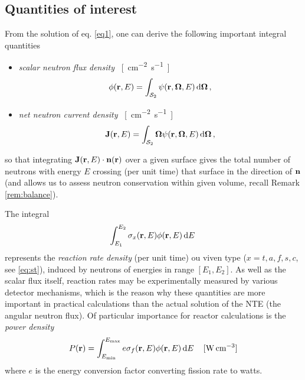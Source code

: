 \subsection{Quantities of interest}\label{sec:qoi}
From the solution of eq. \eqref{eq1}, one can derive the following important integral quantities
\begin{itemize}
  \item \textit{scalar neutron flux density} \SI{}{[cm^{-2}.s^{-1}]}
  \begin{equation}\label{eq:scalar_flux}
    \phi(\mathbf{r}, E) = \int_{\mathcal{S}_2}\psi(\mathbf{r},\mathbf{\Omega},E)\,\text{d}\mathbf{\Omega}\,,
  \end{equation}
  \item \textit{net neutron current density} \SI{}{[cm^{-2}.s^{-1}]}
	\begin{equation}\label{eq:bJ}
		\mathbf{J}(\mathbf{r}, E)	= \int_{\mathcal{S}_2}\mathbf{\Omega}\psi(\mathbf{r},\mathbf{\Omega},E)\,\text{d}\mathbf{\Omega}\,,
	\end{equation}
\end{itemize}
so that integrating $\mathbf{J}(\mathbf{r},E)\cdot\mathbf{n}(\mathbf{r})$ over a given surface 
gives the total number of neutrons with energy $E$ crossing (per unit time) that surface in the direction of 
$\mathbf{n}$ (and allows us to assess neutron conservation within given volume, recall Remark \ref{rem:balance}).

The integral
\begin{equation}\label{eq:rr}
  \int_{E_1}^{E_2}\sigma_x(\mathbf{r}, E) \phi(\mathbf{r}, E)\,\text{d}E\,
\end{equation}
represents the \textit{reaction rate density} (per unit time) ou viven type ($x = t,a,f,s,c$, see \eqref{eq:st}), 
induced by neutrons of energies in range $[E_1, E_2]$. 
As well as the scalar flux itself, reaction rates may be experimentally measured
by various detector mechanisms, which is the reason why these quantities are more important in practical calculations
than the actual solution of the NTE (the angular neutron flux). Of particular importance for reactor calculations is the
\textit{power density} 
\begin{equation}\label{eq:power}
	P(\mathbf{r}) = \int_{E_{\text{min}}}^{E_{\text{max}}}e\sigma_f(\mathbf{r}, E) \phi(\mathbf{r}, E)\,\text{d}E\, \quad \SI{}{[W.cm^{-3}]}
\end{equation}
where $e$ is the energy conversion factor converting fission rate to watts.

